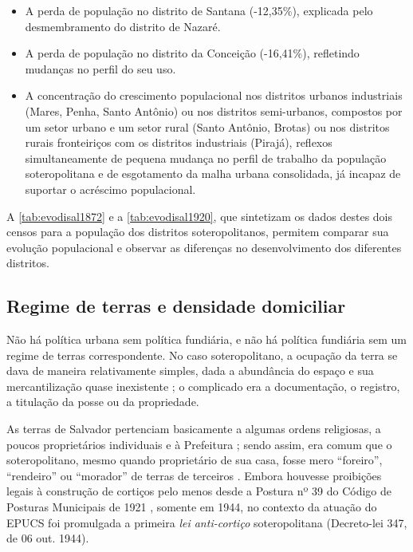 \begin{itemize}
\item A perda de população no distrito de Santana (-12,35\%), explicada pelo desmembramento do distrito de Nazaré.
\item A perda de população no distrito da Conceição (-16,41\%), refletindo mudanças no perfil do seu uso.
\item A concentração do crescimento populacional nos distritos urbanos industriais (Mares, Penha, Santo Antônio) ou nos distritos semi-urbanos, compostos por um setor urbano e um setor rural (Santo Antônio, Brotas) ou nos distritos rurais fronteiriços com os distritos industriais (Pirajá), reflexos simultaneamente de pequena mudança no perfil de trabalho da população soteropolitana e de esgotamento da malha urbana consolidada, já incapaz de suportar o acréscimo populacional.
\end{itemize}

A \autoref{tab:evodisal1872} e a \autoref{tab:evodisal1920}, que sintetizam os dados destes dois censos para a população dos distritos soteropolitanos, permitem comparar sua evolução populacional e observar as diferenças no desenvolvimento dos diferentes distritos. 




\subsection{Regime de terras e densidade domiciliar}\label{subsec:1.4.2}

Não há política urbana sem política fundiária, e não há política fundiária sem um regime de terras correspondente. No caso soteropolitano, a ocupação da terra se dava de maneira relativamente simples, dada a abundância do espaço e sua mercantilização quase inexistente \cite[p.~25]{MOURA1990}; o complicado era a documentação, o registro, a titulação da posse ou da propriedade.

As terras de Salvador pertenciam basicamente a algumas ordens religiosas, a poucos proprietários individuais e à Prefeitura \cite{CEDURB1978}; sendo assim, era comum que o soteropolitano, mesmo quando proprietário de sua casa, fosse mero ``foreiro'', ``rendeiro'' ou ``morador'' de terras de terceiros \cite[p.~139]{BRANDAO1980}. Embora houvesse proibições legais à construção de cortiços pelo menos desde a Postura nº 39 do Código de Posturas Municipais de 1921 \cite{PREFEITURA1921}, somente em 1944, no contexto da atuação do EPUCS foi promulgada a primeira \textit{lei anti-cortiço} soteropolitana (Decreto-lei 347, de 06 out. 1944).

